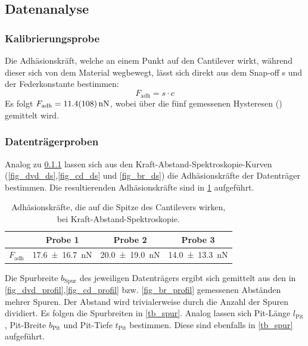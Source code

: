 \documentclass[
	a4paper,
	12pt,
	pagesize,
	ngerman
]{scrartcl}
\begin{document}
	\subsection{Datenanalyse}
	\subsubsection{Kalibrierungsprobe} \label{sss_kali}
	Die Adhäsionskräft, welche an einem Punkt auf den Cantilever wirkt, während dieser sich von dem Material wegbewegt, lässt sich direkt aus dem Snap-off s und der Federkonstante bestimmen: %
	\begin{equation}
			\label{eq_adh}
			F_\text{adh} = s \cdot c
	\end{equation}
	Es folgt $F_\text{adh}=\SI{11.4+-10.8}{nN}$, wobei über die fünf gemessenen Hysteresen () gemittelt wird.

	\subsubsection{Datenträgerproben} %
	Analog zu \cref{sss_kali} lassen sich aus den Kraft-Abstand-Spektroskopie-Kurven (\cref{fig_dvd_ds},\cref{fig_cd_ds} und \cref{fig_br_ds}) die Adhäsionskräfte der Datenträger bestimmen.
	Die resultierenden Adhäsionskräfte sind in \cref{tb_adh} aufgeführt.

\begin{table}[H]
		\centering
		\begin{tabular}{ c | c | c | c }
			 & Probe 1 & Probe 2 & Probe 3\\ \hline
			$F_\text{adh}$ & \SI{17.6+-16.7}{nN} & \SI{20.0+-19.0}{nN} &\SI{14.0+-13.3}{nN} \\
		\end{tabular}
		\caption{Adhäsionskräfte, die auf die Spitze des Cantilevers wirken, bei Kraft-Abstand-Spektroskopie.}
		\label{tb_adh}
\end{table}

	Die Spurbreite $b_\text{Spur}$ des jeweiligen Datenträgers ergibt sich gemittelt aus den in \cref{fig_dvd_profil},\cref{fig_cd_profil} bzw. \cref{fig_br_profil} gemessenen Abständen mehrer Spuren.
	Der Abstand wird trivialerweise durch die Anzahl der Spuren dividiert.
	Es folgen die Spurbreiten in \cref{tb_spur}.
	Analog lassen sich Pit-Länge $l_\text{Pit}$ , Pit-Breite $b_\text{Pit}$ und Pit-Tiefe $t_\text{Pit}$ bestimmen.
	Diese sind ebenfalls in \cref{tb_spur} aufgeführt.
\end{document}
